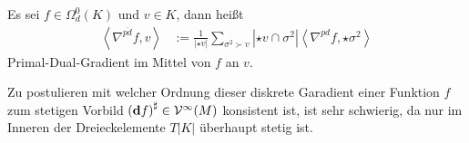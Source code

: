   \begin{definition}
    Es sei \( f\in\Omega^{0}_{d}(K) \) und \( v\in K \), dann heißt
    \begin{align}
      \left\langle \nabla^{\overline{pd}} f, v \right\rangle
          &:= \frac{1}{\left| \star v \right|} \sum_{\sigma^{2}\succ v} \left| \star v \cap \sigma^{2} \right| 
                  \left\langle \nabla^{pd} f , \star\sigma^{2} \right\rangle
    \end{align}
    Primal-Dual-Gradient im Mittel von \( f \) an \( v \).
  \end{definition}
  Zu postulieren mit welcher Ordnung dieser diskrete Garadient einer Funktion \( f \) zum stetigen Vorbild 
  \( \left( \mathbf{d} f \right)^{\sharp}\in \mathcal{V}^{\infty}(M) \) konsistent ist, ist sehr schwierig, da nur im Inneren der Dreieckelemente 
  \( T|K| \) überhaupt stetig ist. 
  
